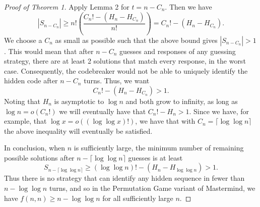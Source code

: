 \documentclass[12pt, a4paper]{article}
\begin{document}
		 \begin{proof}[Proof of Theorem 1]
		 Apply Lemma 2 for $t = n-C_n$. Then we have
		 \begin{equation*}
		 |S_{n-C_{n}}|  \ge n!\left(\frac{C_{n}! - (H_n - H_{C_{n}})}{n!}\right)
		 = C_{n}! - (H_n-H_{C_{n}}).
		 \end{equation*}
		 We choose a $C_{n}$ as small as possible such that the above bound gives $|S_{n-C_n}| > 1$. This would mean that after $n-C_n$ guesses and responses of any guessing strategy, there are at least 2 solutions that match every response, in the worst case. Consequently, the codebreaker would not be able to uniquely identify the hidden code after $n-C_n$ turns. Thus, we want
		 \begin{equation*}
		 C_{n}! - (H_n - H_{C_{n}}) > 1.
		 \end{equation*}
		 Noting that $H_n$ is asymptotic to $\log n$ and both grow to infinity, as long as $\log n = o(C_n!)$ we will eventually have that $C_n!-H_n > 1$. Since we have, for example, that $\log x = o((\log \log x)!)$, we have that with $C_n = \lceil \log \log n \rceil$ the above inequality will eventually be satisfied.
		 
		 In conclusion, when $n$ is sufficiently large, the minimum number of remaining
		 possible solutions after $n - \lceil \log\log n \rceil$ guesses is at least
		 \begin{equation*}
		 S_{n - \lceil \log\log n \rceil} 
		 \ge (\log\log n)! - (H_n - H_{\log\log n})
		 > 1.
		 \end{equation*}
		 Thus there is no strategy that can identify any hidden sequence in fewer than $n-\log\log n$ turns, and so in the Permutation Game variant of Mastermind, we have $f(n, n)\ge n - \log\log n$ for all sufficiently large $n$.
		\end{proof}
		 
		 
\end{document}

